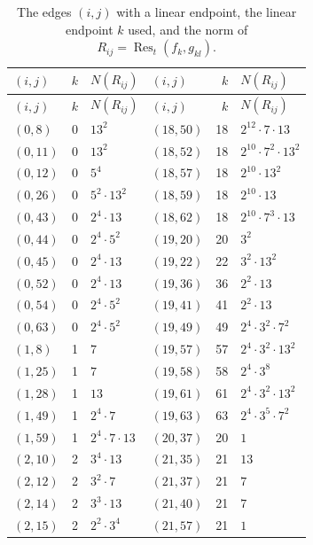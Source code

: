 \documentclass[11pt]{article}
\begin{document}
\begingroup\small
\setlength{\LTcapwidth}{\textwidth}
\begin{longtable}{@{}lrl@{\qquad}lrl@{}}
\caption{The edges $(i,j)$ with a linear endpoint, the linear endpoint $k$ used, and the norm of $R_{ij}=\operatorname{Res}_t(f_k,g_{kl})$.}\label{tab:sep}\\
\hline $(i,j)$ & $k$ & $N(R_{ij})$ & $(i,j)$ & $k$ & $N(R_{ij})$\\\hline\endfirsthead\hline $(i,j)$ & $k$ & $N(R_{ij})$ & $(i,j)$ & $k$ & $N(R_{ij})$\\\hline\endhead\hline\endfoot
$(0,8)$ & 0 & $13^{2}$ & $(18,50)$ & 18 & $2^{12}\cdot 7\cdot 13$\\
$(0,11)$ & 0 & $13^{2}$ & $(18,52)$ & 18 & $2^{10}\cdot 7^{2}\cdot 13^{2}$\\
$(0,12)$ & 0 & $5^{4}$ & $(18,57)$ & 18 & $2^{10}\cdot 13^{2}$\\
$(0,26)$ & 0 & $5^{2}\cdot 13^{2}$ & $(18,59)$ & 18 & $2^{10}\cdot 13$\\
$(0,43)$ & 0 & $2^{4}\cdot 13$ & $(18,62)$ & 18 & $2^{10}\cdot 7^{3}\cdot 13$\\
$(0,44)$ & 0 & $2^{4}\cdot 5^{2}$ & $(19,20)$ & 20 & $3^{2}$\\
$(0,45)$ & 0 & $2^{4}\cdot 13$ & $(19,22)$ & 22 & $3^{2}\cdot 13^{2}$\\
$(0,52)$ & 0 & $2^{4}\cdot 13$ & $(19,36)$ & 36 & $2^{2}\cdot 13$\\
$(0,54)$ & 0 & $2^{4}\cdot 5^{2}$ & $(19,41)$ & 41 & $2^{2}\cdot 13$\\
$(0,63)$ & 0 & $2^{4}\cdot 5^{2}$ & $(19,49)$ & 49 & $2^{4}\cdot 3^{2}\cdot 7^{2}$\\
$(1,8)$ & 1 & $7$ & $(19,57)$ & 57 & $2^{4}\cdot 3^{2}\cdot 13^{2}$\\
$(1,25)$ & 1 & $7$ & $(19,58)$ & 58 & $2^{4}\cdot 3^{8}$\\
$(1,28)$ & 1 & $13$ & $(19,61)$ & 61 & $2^{4}\cdot 3^{2}\cdot 13^{2}$\\
$(1,49)$ & 1 & $2^{4}\cdot 7$ & $(19,63)$ & 63 & $2^{4}\cdot 3^{5}\cdot 7^{2}$\\
$(1,59)$ & 1 & $2^{4}\cdot 7\cdot 13$ & $(20,37)$ & 20 & $1$\\
$(2,10)$ & 2 & $3^{4}\cdot 13$ & $(21,35)$ & 21 & $13$\\
$(2,12)$ & 2 & $3^{2}\cdot 7$ & $(21,37)$ & 21 & $7$\\
$(2,14)$ & 2 & $3^{3}\cdot 13$ & $(21,40)$ & 21 & $7$\\
$(2,15)$ & 2 & $2^{2}\cdot 3^{4}$ & $(21,57)$ & 21 & $1$\\

\end{longtable}
\end{document}
